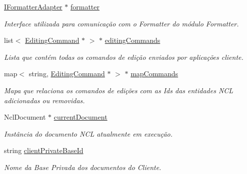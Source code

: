 \begin{DoxyCompactItemize}
\item 
\hyperlink{classbr_1_1ufscar_1_1lince_1_1ginga_1_1wac_1_1editing_1_1IFormatterAdapter}{IFormatterAdapter} $\ast$ \hyperlink{classbr_1_1ufscar_1_1lince_1_1ginga_1_1wac_1_1editing_1_1ClientEditingManager_a49d8d70cee155e1d15c5da2cbb107777}{formatter}
\begin{DoxyCompactList}\small\item\em Interface utilizada para comunicação com o Formatter do módulo Formatter. \item\end{DoxyCompactList}\item 
list$<$ \hyperlink{classbr_1_1ufscar_1_1lince_1_1ginga_1_1wac_1_1editing_1_1EditingCommand}{EditingCommand} $\ast$ $>$ $\ast$ \hyperlink{classbr_1_1ufscar_1_1lince_1_1ginga_1_1wac_1_1editing_1_1ClientEditingManager_aa89f63aad52acdd1fc2502ebe6193be8}{editingCommands}
\begin{DoxyCompactList}\small\item\em Lista que contém todas os comandos de edição enviados por aplicações cliente. \item\end{DoxyCompactList}\item 
map$<$ string, \hyperlink{classbr_1_1ufscar_1_1lince_1_1ginga_1_1wac_1_1editing_1_1EditingCommand}{EditingCommand} $\ast$ $>$ $\ast$ \hyperlink{classbr_1_1ufscar_1_1lince_1_1ginga_1_1wac_1_1editing_1_1ClientEditingManager_a01857fae3b654789d6a6eb665bf9e058}{mapCommands}
\begin{DoxyCompactList}\small\item\em Mapa que relaciona os comandos de edições com as Ids das entidades NCL adicionadas ou removidas. \item\end{DoxyCompactList}\item 
NclDocument $\ast$ \hyperlink{classbr_1_1ufscar_1_1lince_1_1ginga_1_1wac_1_1editing_1_1ClientEditingManager_a9a5b80d7a04837b9796f3ef87972d99a}{currentDocument}
\begin{DoxyCompactList}\small\item\em Instância do documento NCL atualmente em execução. \item\end{DoxyCompactList}\item 
string \hyperlink{classbr_1_1ufscar_1_1lince_1_1ginga_1_1wac_1_1editing_1_1ClientEditingManager_a7610c9f79a41fb3cd819cffdd8c3d576}{clientPrivateBaseId}
\begin{DoxyCompactList}\small\item\em Nome da Base Privada dos documentos do Cliente. \item\end{DoxyCompactList}\item 

\end{DoxyCompactItemize}
